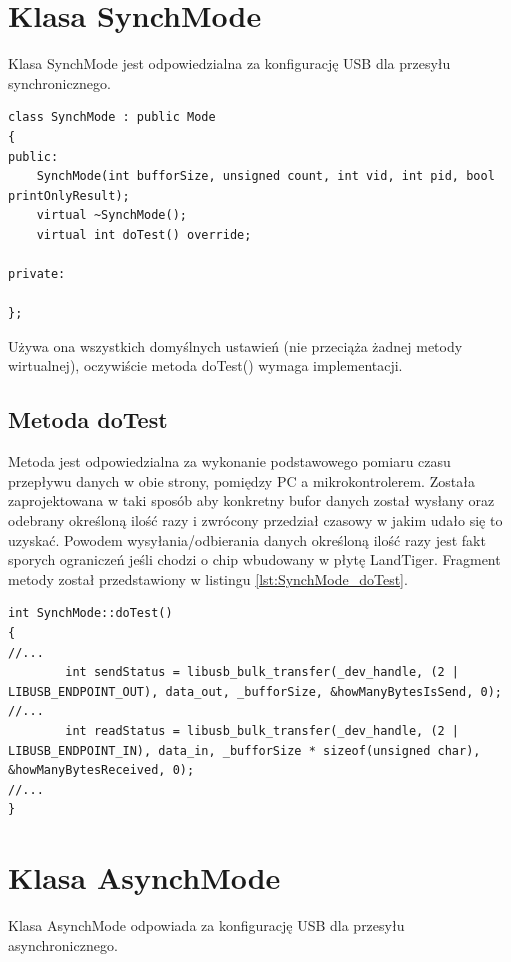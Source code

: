 \documentclass{BscUS}
\begin{document}
\section{Klasa SynchMode}
Klasa SynchMode jest odpowiedzialna za konfigurację USB dla przesyłu synchronicznego. 

\begin{lstlisting}[caption={Deklaracja klasy SynchMode},label={lst:CSynchMode}]
class SynchMode : public Mode
{
public:
	SynchMode(int bufforSize, unsigned count, int vid, int pid, bool printOnlyResult);
	virtual ~SynchMode();
	virtual int doTest() override;

private:

};
\end{lstlisting}
Używa ona wszystkich domyślnych ustawień (nie przeciąża żadnej metody wirtualnej), oczywiście metoda doTest() wymaga implementacji.
\subsection{Metoda doTest}
Metoda jest odpowiedzialna za wykonanie podstawowego pomiaru czasu przepływu danych w obie strony, pomiędzy PC a mikrokontrolerem.
Została zaprojektowana w taki sposób aby konkretny bufor danych został wysłany oraz odebrany określoną ilość razy i zwrócony przedział czasowy w jakim udało się to uzyskać. Powodem wysyłania/odbierania danych określoną ilość razy jest fakt sporych ograniczeń jeśli chodzi o chip wbudowany w płytę LandTiger. Fragment metody został przedstawiony w listingu \ref{lst:SynchMode_doTest}.
\begin{lstlisting}[caption={Fragment metody SynchMode::doTest()},label={lst:SynchMode_doTest}]
int SynchMode::doTest()
{
//...
		int sendStatus = libusb_bulk_transfer(_dev_handle, (2 | LIBUSB_ENDPOINT_OUT), data_out, _bufforSize, &howManyBytesIsSend, 0); 
//...		
		int readStatus = libusb_bulk_transfer(_dev_handle, (2 | LIBUSB_ENDPOINT_IN), data_in, _bufforSize * sizeof(unsigned char), &howManyBytesReceived, 0);
//...
}
\end{lstlisting}
\section{Klasa AsynchMode}
Klasa AsynchMode odpowiada za konfigurację USB dla przesyłu asynchronicznego. 
\end{document}

